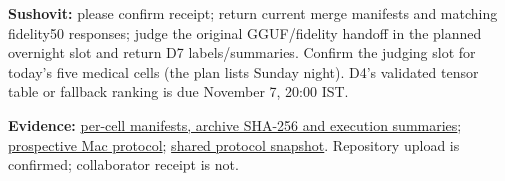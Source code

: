 \documentclass[11pt,a4paper]{article}
\begin{document}
\textbf{Sushovit:} please confirm receipt; return current merge manifests and matching fidelity50 responses; judge the original GGUF/fidelity handoff in the planned overnight slot and return D7 labels/summaries. Confirm the judging slot for today's five medical cells (the plan lists Sunday night). D4's validated tensor table or fallback ranking is due November 7, 20:00 IST.

{\footnotesize\color{Muted}\textbf{Evidence:} \href{https://github.com/SushovitNanda/Lexsi_Hackathon/blob/2ac0a8c/results/mac/nov6/status.json}{per-cell manifests, archive SHA-256 and execution summaries}; \href{https://github.com/SushovitNanda/Lexsi_Hackathon/blob/2ac0a8c/MAC_PREREG_2026-11-06.md}{prospective Mac protocol}; \href{https://github.com/SushovitNanda/Lexsi_Hackathon/blob/2ac0a8c/references/SUSHOVIT_PREREG_2026-11-05.md}{shared protocol snapshot}. Repository upload is confirmed; collaborator receipt is not.\par}
\end{document}
